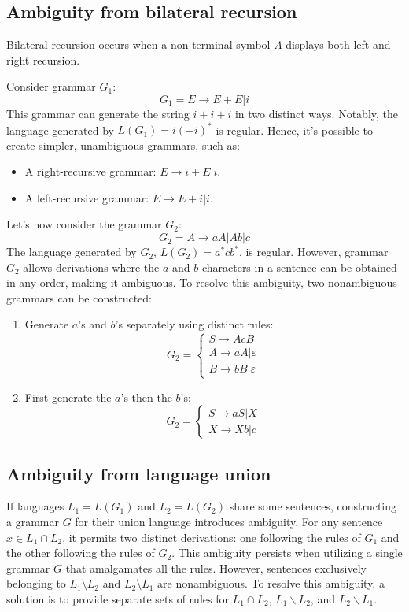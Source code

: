 \subsection{Ambiguity from bilateral recursion}
Bilateral recursion occurs when a non-terminal symbol $A$ displays both left and right recursion.
\begin{example}
    Consider grammar $G_1$:
    \[G_1= E \rightarrow E+E|i\]
    This grammar can generate the string $i+i+i$ in two distinct ways. 
    Notably, the language generated by $L(G_1)=i(+i)^{*}$ is regular.
    Hence, it's possible to create simpler, unambiguous grammars, such as:
    \begin{itemize}
        \item A right-recursive grammar: $E \rightarrow i+E|i$.
        \item A left-recursive grammar: $E \rightarrow E+i|i$.
    \end{itemize}

    Let's now consider the grammar $G_2$:
    \[G_2= A \rightarrow aA|Ab|c\]
    The language generated by $G_2$, $L(G_2) = a^{*}cb^{*}$, is regular. 
    However, grammar $G_2$ allows derivations where the $a$ and $b$ characters in a sentence can be obtained in any order, making it ambiguous.
    To resolve this ambiguity, two nonambiguous grammars can be constructed:
    \begin{enumerate}
        \item Generate $a$'s and $b$'s separately using distinct rules:
            \[G_2=\begin{cases}
                S \rightarrow AcB               \\
                A \rightarrow aA|\varepsilon    \\
                B \rightarrow bB|\varepsilon 
            \end{cases}\]
        \item First generate the $a$'s then the $b$'s:
            \[G_2=\begin{cases}
                S \rightarrow aS|X              \\
                X \rightarrow Xb|c   
            \end{cases}\]
    \end{enumerate} 
\end{example}

\subsection{Ambiguity from language union}
If languages $L_1=L(G_1)$ and $L_2=L(G_2)$ share some sentences, constructing a grammar $G$ for their union language introduces ambiguity.
For any sentence $x \in L_1 \cap L_2$, it permits two distinct derivations: one following the rules of $G_1$ and the other following the rules of $G_2$.
This ambiguity persists when utilizing a single grammar $G$ that amalgamates all the rules.
However, sentences exclusively belonging to $L_1 \setminus L_2$ and $L_2 \setminus L_1$ are nonambiguous. 
To resolve this ambiguity, a solution is to provide separate sets of rules for $L_1 \cap L_2$, $L_1 \backslash L_2$, and $L_2 \backslash L_1$.

